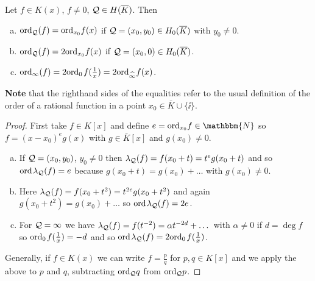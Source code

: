 \documentclass[english,11pt,a4paper]{article}
\begin{document}
\begin{lemma}\label{two}
  Let $f \in K(x)$, $f \neq 0$, $\mathcal{Q} \in H(\overline K)$. Then
  \begin{enumerate}[(a)]\parskip 1mm
	  \item $\text{ord}_{\mathcal{Q}} (f) = \text{ord}_{x_0} f(x)$ if $\mathcal{Q} = (x_0,y_0) \in H_0(\overline K)$ with $y_0 \neq 0$.
	  \item $\text{ord}_{\mathcal{Q}} (f) = 2 \text{ord}_{x_0} f(x)$ if $\mathcal{Q} = (x_0,0) \in H_0(\overline K)$.
	  \item $\text{ord}_{\infty} (f) = 2 \text{ord}_0\hspace{0.4mm} f(\frac 1 x) = 2 \text{ord}_{\widehat{\infty}} f(x)$.
	\end{enumerate}\parskip 3mm
	\textbf{Note} that the righthand sides of the equalities refer to the usual definition of the order of a rational function in a point $x_0 \in \bar K \cup \{ \ii \}$.%
	\begin{proof}
		First take $f \in K[x]$ and define $e = \ordx f \in \mathbbm{N}$ so $f = (x-x_0)^e g(x)$ with $g \in \bar K[x]$ and $g(x_0)\neq 0$.
		\begin{enumerate}[(a)]
	  	\item If $\mathcal{Q} =(x_0,y_0)$, $y_0 \neq 0$ then $\lambda_{\mathcal{Q}} (f) = f(x_0 + t) = t^e g(x_0 + t)$ and so $\text{ord\hspace{0.4mm}} \lambda_{\mathcal{Q}} (f) = e$ because $g(x_0 + t) = g(x_0) + \dots$ with $g(x_0) \neq 0$.

	  	\item Here $\lambda_{\mathcal{Q}} (f) = f(x_0 + t^2) = t^{2e} g(x_0 + t^2)$ and again $g(x_0 + t^2) = g(x_0) + \dots$ so $\text{ord\hspace{0.4mm}} \lambda_{\mathcal{Q}} (f) = 2e$.

	  	\item For $\mathcal{Q} = \infty$ we have $\lambda_{\mathcal{Q}} (f) = f(t^{-2}) = \alpha t^{-2d}+ \dots$ with $\alpha \neq 0$ if $d = \deg f$ so $\text{ord}_0\hspace{0.4mm} f(\frac 1 x ) = -d$ and so $\text{ord\hspace{0.4mm}} \lambda_{\mathcal{Q}} (f) = 2 \text{ord}_0\hspace{0.4mm} f(\frac 1 x )$.
		\end{enumerate}
		Generally, if $f \in K(x)$ we can write $f = \frac p q$ for $p, q \in K[x]$ and we apply the above to $p$ and $q$, subtracting $\text{ord}_{\mathcal{Q}} q$ from $\text{ord}_{\mathcal{Q}} p$.%
	\end{proof}
\end{lemma}
\end{document}
